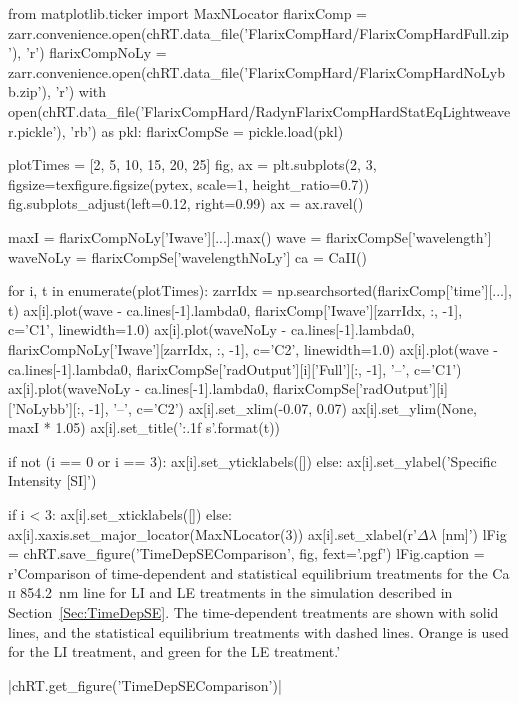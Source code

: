 \begin{pycode}[TimeDepRT]
from matplotlib.ticker import MaxNLocator
flarixComp = zarr.convenience.open(chRT.data_file('FlarixCompHard/FlarixCompHardFull.zip'), 'r')
flarixCompNoLy = zarr.convenience.open(chRT.data_file('FlarixCompHard/FlarixCompHardNoLybb.zip'), 'r')
with open(chRT.data_file('FlarixCompHard/RadynFlarixCompHardStatEqLightweaver.pickle'), 'rb') as pkl:
    flarixCompSe = pickle.load(pkl)

plotTimes = [2, 5, 10, 15, 20, 25]
fig, ax = plt.subplots(2, 3, figsize=texfigure.figsize(pytex, scale=1, height_ratio=0.7))
fig.subplots_adjust(left=0.12, right=0.99)
ax = ax.ravel()

maxI = flarixCompNoLy['Iwave'][...].max()
wave = flarixCompSe['wavelength']
waveNoLy = flarixCompSe['wavelengthNoLy']
ca = CaII()

for i, t in enumerate(plotTimes):
    zarrIdx = np.searchsorted(flarixComp['time'][...], t)
    ax[i].plot(wave - ca.lines[-1].lambda0, flarixComp['Iwave'][zarrIdx, :, -1], c='C1', linewidth=1.0)
    ax[i].plot(waveNoLy - ca.lines[-1].lambda0, flarixCompNoLy['Iwave'][zarrIdx, :, -1], c='C2', linewidth=1.0)
    ax[i].plot(wave - ca.lines[-1].lambda0, flarixCompSe['radOutput'][i]['Full'][:, -1], '--', c='C1')
    ax[i].plot(waveNoLy - ca.lines[-1].lambda0, flarixCompSe['radOutput'][i]['NoLybb'][:, -1], '--', c='C2')
    ax[i].set_xlim(-0.07, 0.07)
    ax[i].set_ylim(None, maxI * 1.05)
    ax[i].set_title('{:.1f} s'.format(t))

    if not (i == 0 or i == 3):
        ax[i].set_yticklabels([])
    else:
        ax[i].set_ylabel('Specific Intensity [SI]')

    if i < 3:
        ax[i].set_xticklabels([])
    else:
        ax[i].xaxis.set_major_locator(MaxNLocator(3))
        ax[i].set_xlabel(r'$\Delta\lambda$ [nm]')
lFig = chRT.save_figure('TimeDepSEComparison', fig, fext='.pgf')
lFig.caption = r'Comparison of time-dependent and statistical equilibrium treatments for the Ca\,\textsc{ii} \SI{854.2}{\nano\metre} line for LI and LE treatments in the simulation described in Section~\ref{Sec:TimeDepSE}. The time-dependent treatments are shown with solid lines, and the statistical equilibrium treatments with dashed lines. Orange is used for the LI treatment, and green for the LE treatment.'
\end{pycode}

\py[TimeDepRT]|chRT.get_figure('TimeDepSEComparison')|

